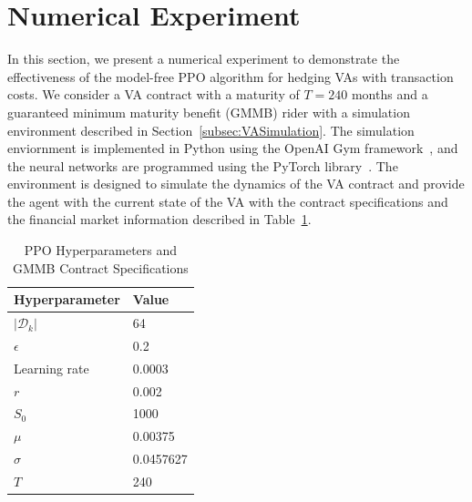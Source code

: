 \section{Numerical Experiment}

In this section, we present a numerical experiment to demonstrate the effectiveness of the model-free PPO algorithm for hedging VAs with transaction costs.
We consider a VA contract with a maturity of $T=240$ months and a guaranteed minimum maturity benefit (GMMB) rider with a simulation environment described in Section~\ref{subsec:VASimulation}.
The simulation enviornment is implemented in Python using the OpenAI Gym framework~\citep{brockman2016openai}, and the neural networks are programmed using the PyTorch library~\citep{paszke2019pytorch}.
The environment is designed to simulate the dynamics of the VA contract and provide the agent with the current state of the VA with the contract specifications and the financial market information described in Table~\ref{tab3:hyperparameters}.

\begin{table}[ht!]
    \centering
    \begin{tabular}{ll} 
        \toprule
        Hyperparameter & Value \\
        \midrule
        $|\mathcal{D}_k|$   & 64        \\
        $\epsilon$          & 0.2       \\
        Learning rate       & 0.0003    \\
        $r$                 & 0.002     \\
        $S_0$               & 1000      \\
        $\mu$               & 0.00375   \\
        $\sigma$            & 0.0457627 \\
        $T$                 & 240       \\
        \bottomrule
    \end{tabular}
    \caption{PPO Hyperparameters and GMMB Contract Specifications} 
    \label{tab3:hyperparameters}
\end{table}

